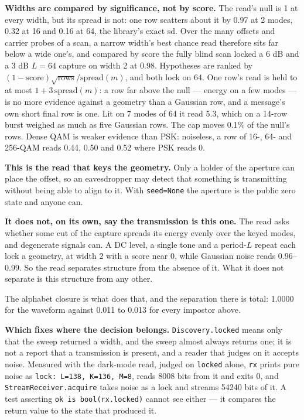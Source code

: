 \documentclass[10pt,letterpaper,twocolumn]{article}
\begin{document}
\textbf{Widths are compared by significance, not by score.} The read's null is 1 at every width, but its spread is not: one row scatters about it by 0.97 at 2 modes, 0.32 at 16 and 0.16 at 64, the library's exact sd. Over the many offsets and carrier probes of a scan, a narrow width's best chance read therefore sits far below a wide one's, and compared by score the fully blind scan locked a 6 dB and a 3 dB \(L = 64\) capture on width 2 at 0.98. Hypotheses are ranked by \((1 - \text{score})\sqrt{\text{rows}}/\text{spread}(m)\), and both lock on 64. One row's read is held to at most \(1 + 3\,\text{spread}(m)\): a row far above the null --- energy on a few modes --- is no more evidence against a geometry than a Gaussian row, and a message's own short final row is one. Lit on 7 modes of 64 it read 5.3, which on a 14-row burst weighed as much as five Gaussian rows. The cap moves 0.1\% of the null's rows. Dense QAM is weaker evidence than PSK: noiseless, a row of 16-, 64- and 256-QAM reads 0.44, 0.50 and 0.52 where PSK reads 0.

\textbf{This is the read that keys the geometry.} Only a holder of the aperture can place the offset, so an eavesdropper may detect that something is transmitting without being able to align to it. With \texttt{seed=\allowbreak{}None} the aperture is the public zero state and anyone can.

\textbf{It does not, on its own, say the transmission is this one.} The read asks whether some cut of the capture spreads its energy evenly over the keyed modes, and degenerate signals can. A DC level, a single tone and a period-\(L\) repeat each lock a geometry, at width 2 with a score near 0, while Gaussian noise reads 0.96--0.99. So the read separates structure from the absence of it. What it does not separate is this structure from any other.

The alphabet closure is what does that, and the separation there is total: 1.0000 for the waveform against 0.011 to 0.013 for every impostor above.

\textbf{Which fixes where the decision belongs.} \texttt{Discovery.\allowbreak{}locked} means only that the sweep returned a width, and the sweep almost always returns one; it is not a report that a transmission is present, and a reader that judges on it accepts noise. Measured with the dark-mode read, judged on \texttt{locked} alone, \texttt{rx} prints pure noise as \texttt{lock:\allowbreak{}\ L=\allowbreak{}138,\allowbreak{}\ K=\allowbreak{}136,\allowbreak{}\ M=\allowbreak{}8}, reads 8008 bits from it and exits 0, and \texttt{StreamReceiver.\allowbreak{}acquire} takes noise as a lock and streams 54240 bits of it. A test asserting \texttt{ok\ is\ bool(\allowbreak{}rx.\allowbreak{}locked)\allowbreak{}} cannot see either --- it compares the return value to the state that produced it.
\end{document}
